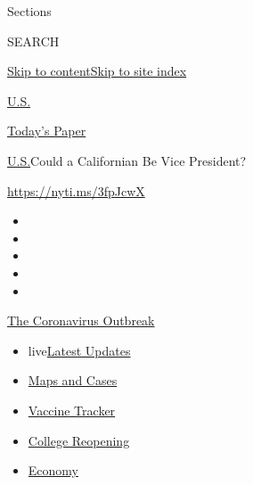 Sections

SEARCH

\protect\hyperlink{site-content}{Skip to
content}\protect\hyperlink{site-index}{Skip to site index}

\href{https://www.nytimes3xbfgragh.onion/section/us}{U.S.}

\href{https://myaccount.nytimes3xbfgragh.onion/auth/login?response_type=cookie\&client_id=vi}{}

\href{https://www.nytimes3xbfgragh.onion/section/todayspaper}{Today's
Paper}

\href{/section/us}{U.S.}\textbar{}Could a Californian Be Vice President?

\url{https://nyti.ms/3fpJcwX}

\begin{itemize}
\item
\item
\item
\item
\item
\end{itemize}

\href{https://www.nytimes3xbfgragh.onion/news-event/coronavirus?action=click\&pgtype=Article\&state=default\&region=TOP_BANNER\&context=storylines_menu}{The
Coronavirus Outbreak}

\begin{itemize}
\tightlist
\item
  live\href{https://www.nytimes3xbfgragh.onion/2020/08/04/world/coronavirus-cases.html?action=click\&pgtype=Article\&state=default\&region=TOP_BANNER\&context=storylines_menu}{Latest
  Updates}
\item
  \href{https://www.nytimes3xbfgragh.onion/interactive/2020/us/coronavirus-us-cases.html?action=click\&pgtype=Article\&state=default\&region=TOP_BANNER\&context=storylines_menu}{Maps
  and Cases}
\item
  \href{https://www.nytimes3xbfgragh.onion/interactive/2020/science/coronavirus-vaccine-tracker.html?action=click\&pgtype=Article\&state=default\&region=TOP_BANNER\&context=storylines_menu}{Vaccine
  Tracker}
\item
  \href{https://www.nytimes3xbfgragh.onion/2020/08/02/us/covid-college-reopening.html?action=click\&pgtype=Article\&state=default\&region=TOP_BANNER\&context=storylines_menu}{College
  Reopening}
\item
  \href{https://www.nytimes3xbfgragh.onion/live/2020/08/04/business/stock-market-today-coronavirus?action=click\&pgtype=Article\&state=default\&region=TOP_BANNER\&context=storylines_menu}{Economy}
\end{itemize}


